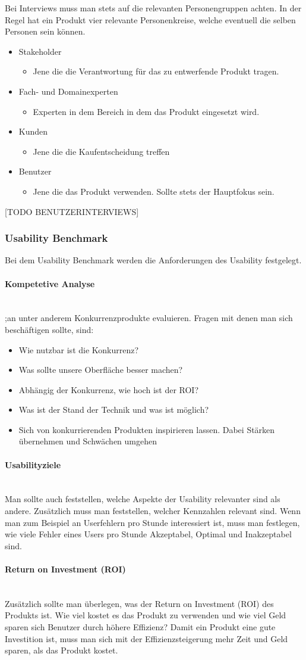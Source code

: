 \documentclass{article}
\newcommand{\paragraphlb}[1]{\paragraph{#1}\mbox{}\\}
\begin{document}
	Bei Interviews muss man stets auf die relevanten Personengruppen achten. In der Regel hat ein Produkt vier relevante Personenkreise, welche eventuell die selben Personen sein können.
	\begin{itemize}
		\item{Stakeholder}
		\begin{itemize}
			\item{Jene die die Verantwortung für das zu entwerfende Produkt tragen.}
		\end{itemize}
		\item{Fach- und Domainexperten}
		\begin{itemize}
			\item{Experten in dem Bereich in dem das Produkt eingesetzt wird.}
		\end{itemize}
		\item{Kunden}
		\begin{itemize}
			\item{Jene die die Kaufentscheidung treffen}
		\end{itemize}
		\item{Benutzer}
		\begin{itemize}
			\item{Jene die das Produkt verwenden. Sollte stets der Hauptfokus sein.}
		\end{itemize}
	\end{itemize}
	[TODO BENUTZERINTERVIEWS]
	\subsubsection{Usability Benchmark}
	Bei dem Usability Benchmark werden die Anforderungen des Usability festgelegt. 
	\paragraphlb{Kompetetive Analyse}
	;an unter anderem Konkurrenzprodukte evaluieren. Fragen mit denen man sich beschäftigen sollte, sind:
	\begin{itemize}
		\item{Wie nutzbar ist die Konkurrenz?}
		\item{Was sollte unsere Oberfläche besser machen?}
		\item{Abhängig der Konkurrenz, wie hoch ist der ROI?}
		\item{Was ist der Stand der Technik und was ist möglich?}
		\item{Sich von konkurrierenden Produkten inspirieren lassen. Dabei Stärken übernehmen und Schwächen umgehen}
	\end{itemize}
	\paragraphlb{Usabilityziele}
	Man sollte auch feststellen, welche Aspekte der Usability relevanter sind als andere. Zusätzlich muss man feststellen, welcher Kennzahlen relevant sind. Wenn man zum Beispiel an Userfehlern pro Stunde interessiert ist, muss man festlegen, wie viele Fehler eines Users pro Stunde Akzeptabel, Optimal und Inakzeptabel sind.
	\paragraphlb{Return on Investment (ROI)}
	Zusätzlich sollte man überlegen, was der Return on Investment (ROI) des Produkts ist. Wie viel kostet es das Produkt zu verwenden und wie viel Geld sparen sich Benutzer durch höhere Effizienz? Damit ein Produkt eine gute Investition ist, muss man sich mit der Effizienzsteigerung mehr Zeit und Geld sparen, als das Produkt kostet.
\end{document}
